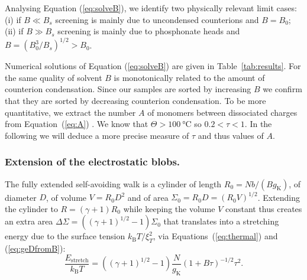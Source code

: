 \documentclass[twoside,twocolumn,9pt]{article}
\begin{document}
Analysing Equation (\ref{eq:solveB}), we identify two physically relevant limit cases: (i) if $B \ll B_s$ screening is mainly due to uncondensed counterions and $B = B_0$; (ii) if $B \gg B_s$ screening is mainly due to phosphonate heads and $B = \left(B_0^3/B_s\right)^{1/2} > B_0$.

Numerical solutions of Equation (\ref{eq:solveB}) are given in Table~\ref{tab:results}. For the same quality of solvent $B$ is monotonically related to the amount of counterion condensation. Since our samples are sorted by increasing $B$ we confirm that they are sorted by decreasing counterion condensation. To be more quantitative, we extract the number $A$ of monomers between dissociated charges from Equation~(\ref{eq:A})%
.
%
We know that $\Theta>\SI{100}{\celsius}$ so $0.2<\tau<1$. In the following we will deduce a more precise measure of $\tau$ and thus values of $A$.


%

\subsubsection{Extension of the electrostatic blobs.}

The fully extended self-avoiding walk is a cylinder of length $R_0 = Nb/(Bg_\mathrm{K})$, of diameter $D$, of volume $V = R_0 D^2$ and of area $\Sigma_0 = R_0 D = (R_0 V)^{1/2}$. Extending the cylinder to $R = (\gamma+1) R_0$ while keeping the volume $V$ constant thus creates an extra area 
$
\Delta\Sigma = \left(\left(\gamma +1\right)^{1/2} -1\right) \Sigma_0
$
that translates into a stretching energy due to the surface tension $k_\mathrm{B}T/\xi_T^2$, via Equations~(\ref{eq:thermal}) and (\ref{eq:geDfromB}):
\begin{equation}
\frac{E_\mathrm{stretch}}{k_\mathrm{B}T} = \left(\left(\gamma +1\right)^{1/2} -1\right) \frac{N}{g_\mathrm{K}} (1+B\tau)^{-1/2} \tau^2.
\label{eq:stretch}
\end{equation}
\end{document}
